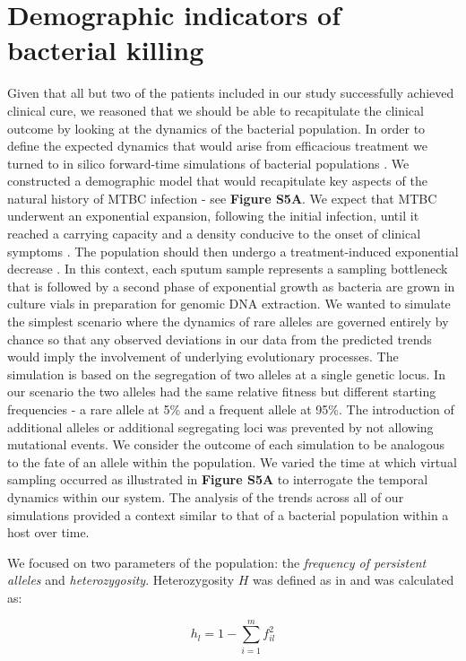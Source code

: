 \documentclass[12pt, oneside]{article}   	%
\begin{document}
\section{Demographic indicators of bacterial killing}
Given that all but two of the patients included in our study successfully achieved clinical cure, we reasoned that we should be able to recapitulate the clinical outcome by looking at the dynamics of the bacterial population. In order to define the expected dynamics that would arise from efficacious treatment we turned to in silico forward-time simulations of bacterial populations \cite{simuPOP}. We constructed a demographic model that would recapitulate key aspects of the natural history of MTBC infection - see \textbf{Figure S5A}. We expect that MTBC underwent an exponential expansion, following the initial infection, until it reached a carrying capacity and a density conducive to the onset of clinical symptoms \cite{Lawn2010}. The population should then undergo a treatment-induced exponential decrease \cite{EBA}. In this context, each sputum sample represents a sampling bottleneck that is followed by a second phase of exponential growth as bacteria are grown in culture vials in preparation for genomic DNA extraction.
We wanted to simulate the simplest scenario where the dynamics of rare alleles are governed entirely by chance so that any observed deviations in our data from the predicted trends would imply the involvement of underlying evolutionary processes. The simulation is based on the segregation of two alleles at a single genetic locus. In our scenario the two alleles had the same relative fitness but different starting frequencies - a rare allele at 5\% and a frequent allele at 95\%. The introduction of additional alleles or additional segregating loci was prevented by not allowing mutational events. We consider the outcome of each simulation to be analogous to the fate of an allele within the population. We varied the time at which virtual sampling occurred as illustrated in \textbf{Figure S5A} to interrogate the temporal dynamics within our system. The analysis of the trends across all of our simulations provided a context similar to that of a bacterial population within a host over time.

We focused on two parameters of the population: the \emph{frequency of persistent alleles} and \emph{heterozygosity}. Heterozygosity $H$ was defined as in \cite{Cuevas2015} and was calculated as:

\begin{equation} \label{eq:locus}
h_l = 1-\sum^m_{i=1}f^2_{il}
\end{equation}
\end{document}
